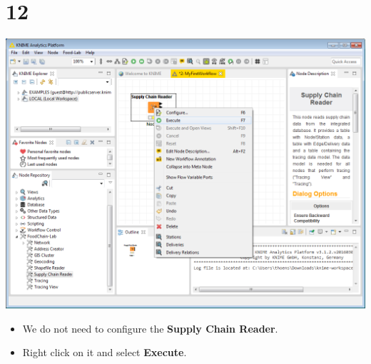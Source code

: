 \documentclass[10pt]{beamer}
\begin{document}
\section{12}
\begin{frame}
	\begin{center}
  		\includegraphics[height=0.6\textheight]{12.png}
	\end{center}
	\begin{itemize}
		\item We do not need to configure the \textbf{Supply Chain Reader}.
		\item Right click on it and select \textbf{Execute}.
	\end{itemize}
\end{frame}
\end{document}
